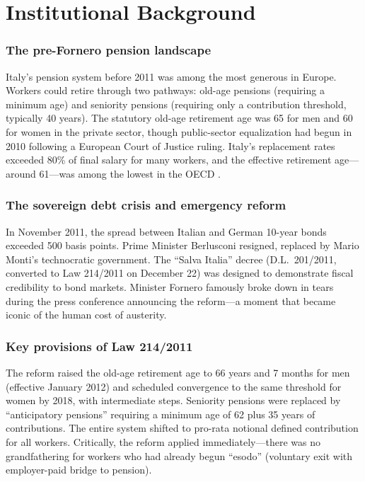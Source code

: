 \documentclass[12pt]{article}
\begin{document}
\section{Institutional Background}

\subsubsection*{The pre-Fornero pension landscape} Italy's pension system before 2011 was among the most generous in Europe. Workers could retire through two pathways: old-age pensions (requiring a minimum age) and seniority pensions (requiring only a contribution threshold, typically 40 years). The statutory old-age retirement age was 65 for men and 60 for women in the private sector, though public-sector equalization had begun in 2010 following a European Court of Justice ruling. Italy's replacement rates exceeded 80\% of final salary for many workers, and the effective retirement age---around 61---was among the lowest in the OECD \citep{fornero2006}.

\subsubsection*{The sovereign debt crisis and emergency reform} In November 2011, the spread between Italian and German 10-year bonds exceeded 500 basis points. Prime Minister Berlusconi resigned, replaced by Mario Monti's technocratic government. The ``Salva Italia'' decree (D.L.\ 201/2011, converted to Law 214/2011 on December 22) was designed to demonstrate fiscal credibility to bond markets. Minister Fornero famously broke down in tears during the press conference announcing the reform---a moment that became iconic of the human cost of austerity.

\subsubsection*{Key provisions of Law 214/2011} The reform raised the old-age retirement age to 66 years and 7 months for men (effective January 2012) and scheduled convergence to the same threshold for women by 2018, with intermediate steps. Seniority pensions were replaced by ``anticipatory pensions'' requiring a minimum age of 62 plus 35 years of contributions. The entire system shifted to pro-rata notional defined contribution for all workers. Critically, the reform applied immediately---there was no grandfathering for workers who had already begun ``esodo'' (voluntary exit with employer-paid bridge to pension).
\end{document}
